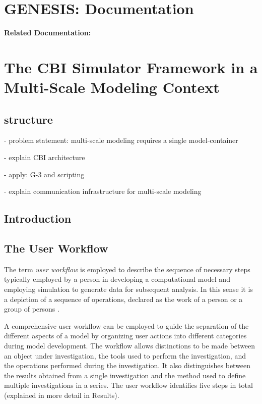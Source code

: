 \documentclass[12pt]{article}
\begin{document}
\section*{GENESIS: Documentation}

{\bf Related Documentation:}

\section*{The CBI Simulator Framework in a Multi-Scale Modeling Context}

\subsection*{structure}

- problem statement: multi-scale modeling requires a single model-container

- explain CBI architecture

- apply: G-3 and scripting

- explain communication infrastructure for multi-scale modeling


\subsection*{Introduction}

\subsection*{The User Workflow}

The term {\it user workflow} is employed to describe the sequence of
necessary steps typically employed by a person in developing a
computational model and employing simulation to generate data for
subsequent analysis. In this sense it is a depiction of a sequence of
operations, declared as the work of a person or a group of persons
\cite{Belhajjame:2001fv}.

A comprehensive user workflow can be employed to guide the separation
of the different aspects of a model by organizing user actions into
different categories during model development.  The workflow allows
distinctions to be made between an object under investigation, the
tools used to perform the investigation, and the operations performed
during the investigation. It also distinguishes between the results
obtained from a single investigation and the method used to define
multiple investigations in a series. The user workflow identifies five
steps in total (explained in more detail in Results).
\end{document}
